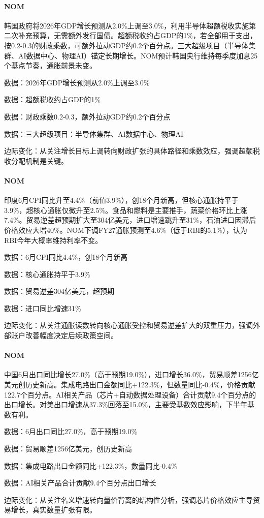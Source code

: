 \documentclass[11pt]{ctexart}
\begin{document}
\paragraph{NOM} 韩国政府将2026年GDP增长预测从2.0\%上调至3.0\%，利用半导体超额税收实施第二次补充预算，无需额外发行国债。超额税收约占GDP的1\%，若全部用于支出，按0.2-0.3的财政乘数，可额外拉动GDP约0.2个百分点。三大超级项目（半导体集群、AI数据中心、物理AI）锚定长期增长。NOM预计韩国央行维持每季度加息25个基点节奏，通胀前景未变。
{\small\color{refgray}数据：2026年GDP增长预测从2.0\%上调至3.0\%\par}
{\small\color{refgray}数据：超额税收约占GDP的1\%\par}
{\small\color{refgray}数据：财政乘数0.2-0.3，额外拉动GDP约0.2个百分点\par}
{\small\color{refgray}数据：三大超级项目：半导体集群、AI数据中心、物理AI\par}
{\small\color{refgray}边际变化：从关注增长目标上调转向财政扩张的具体路径和乘数效应，强调超额税收分配机制是关键。\par}
\paragraph{NOM} 印度6月CPI同比升至4.4\%（前值3.9\%），创18个月新高，但核心通胀持平于3.9\%，超核心通胀仅微升至2.5\%。食品和燃料是主要推手，蔬菜价格环比上涨7.4\%。贸易逆差超预期扩大至304亿美元，进口增速跳升至31\%，石油进口因滞后价格效应大增40\%。NOM下调FY27通胀预测至4.6\%（低于RBI的5.1\%），认为RBI今年大概率维持利率不变。
{\small\color{refgray}数据：6月CPI同比4.4\%，创18个月新高\par}
{\small\color{refgray}数据：核心通胀持平于3.9\%\par}
{\small\color{refgray}数据：贸易逆差304亿美元，超预期\par}
{\small\color{refgray}数据：进口同比增速31\%\par}
{\small\color{refgray}边际变化：从关注通胀读数转向核心通胀受控和贸易逆差扩大的双重压力，强调外部账户改善幅度决定后续政策空间。\par}
\paragraph{NOM} 中国6月出口同比增长27.0\%（高于预期19.0\%），进口增长36.0\%，贸易顺差1256亿美元创历史新高。集成电路出口金额同比+122.3\%，但数量同比-0.4\%，价格贡献122.7个百分点。AI相关产品（芯片+自动数据处理设备）合计贡献9.4个百分点的出口增长。对美出口增速从37.3\%回落至15.0\%，主要受基数效应影响，下半年基数有利。
{\small\color{refgray}数据：6月出口同比27.0\%，高于预期19.0\%\par}
{\small\color{refgray}数据：贸易顺差1256亿美元，创历史新高\par}
{\small\color{refgray}数据：集成电路出口金额同比+122.3\%，数量同比-0.4\%\par}
{\small\color{refgray}数据：AI相关产品合计贡献9.4个百分点出口增长\par}
{\small\color{refgray}边际变化：从关注名义增速转向量价背离的结构性分析，强调芯片价格效应主导贸易增长，真实数量扩张有限。\par}
\end{document}
